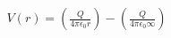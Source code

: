 \documentclass[preview]{standalone}
\begin{document}
\begin{align*}
V(r) = \left(\frac{Q}{4\pi \epsilon_0 r}\right) - \left(\frac{Q}{4\pi \epsilon_0 \infty}\right)
\end{align*}
\end{document}
